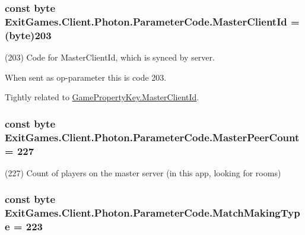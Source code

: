 \subsubsection[{\texorpdfstring{Master\+Client\+Id}{MasterClientId}}]{\setlength{\rightskip}{0pt plus 5cm}const byte Exit\+Games.\+Client.\+Photon.\+Parameter\+Code.\+Master\+Client\+Id = (byte)203}\hypertarget{class_exit_games_1_1_client_1_1_photon_1_1_parameter_code_a1f3cfe3d4e33a66a1b43f69b61c1371d}{}\label{class_exit_games_1_1_client_1_1_photon_1_1_parameter_code_a1f3cfe3d4e33a66a1b43f69b61c1371d}


(203) Code for Master\+Client\+Id, which is synced by server. 

When sent as op-\/parameter this is code 203.

Tightly related to \hyperlink{class_exit_games_1_1_client_1_1_photon_1_1_game_property_key_ae06d85caaaad94ef81bb048f4e8a9c3c}{Game\+Property\+Key.\+Master\+Client\+Id}.
\subsubsection[{\texorpdfstring{Master\+Peer\+Count}{MasterPeerCount}}]{\setlength{\rightskip}{0pt plus 5cm}const byte Exit\+Games.\+Client.\+Photon.\+Parameter\+Code.\+Master\+Peer\+Count = 227}\hypertarget{class_exit_games_1_1_client_1_1_photon_1_1_parameter_code_a362ac423e3572752f5b8b29270d059c8}{}\label{class_exit_games_1_1_client_1_1_photon_1_1_parameter_code_a362ac423e3572752f5b8b29270d059c8}


(227) Count of players on the master server (in this app, looking for rooms)

\subsubsection[{\texorpdfstring{Match\+Making\+Type}{MatchMakingType}}]{\setlength{\rightskip}{0pt plus 5cm}const byte Exit\+Games.\+Client.\+Photon.\+Parameter\+Code.\+Match\+Making\+Type = 223}\hypertarget{class_exit_games_1_1_client_1_1_photon_1_1_parameter_code_aaad13b916a824219a4f7277f41f46858}{}\label{class_exit_games_1_1_client_1_1_photon_1_1_parameter_code_aaad13b916a824219a4f7277f41f46858}


